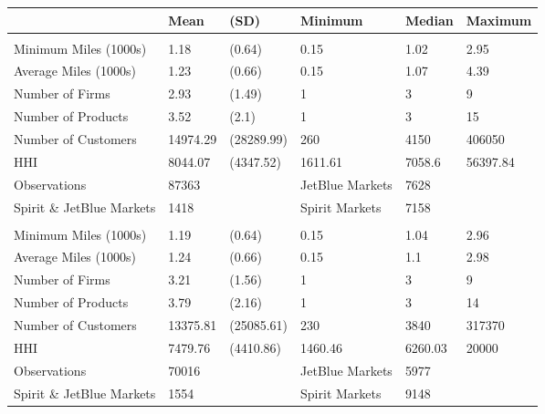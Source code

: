 
\begin{tabular}[t]{llllll}
\toprule
 & Mean & (SD) & Minimum & Median & Maximum\\
\midrule
\addlinespace[0.3em]
\multicolumn{6}{l}{\textbf{Pre-Pandemic}}\\
\hspace{1em}Minimum Miles (1000s) & 1.18 & (0.64) & 0.15 & 1.02 & 2.95\\
\hspace{1em}Average Miles (1000s) & 1.23 & (0.66) & 0.15 & 1.07 & 4.39\\
\hspace{1em}Number of Firms & 2.93 & (1.49) & 1 & 3 & 9\\
\hspace{1em}Number of Products & 3.52 & (2.1) & 1 & 3 & 15\\
\hspace{1em}Number of Customers & 14974.29 & (28289.99) & 260 & 4150 & 406050\\
\hspace{1em}HHI & 8044.07 & (4347.52) & 1611.61 & 7058.6 & 56397.84\\
\midrule
\hspace{1em}Observations & 87363 &  & JetBlue Markets & 7628 & \\
\hspace{1em}Spirit \& JetBlue Markets & 1418 &  & Spirit Markets & 7158 & \\
\midrule
\addlinespace[0.3em]
\multicolumn{6}{l}{\textbf{Post-Pandemic}}\\
\hspace{1em}Minimum Miles (1000s) & 1.19 & (0.64) & 0.15 & 1.04 & 2.96\\
\hspace{1em}Average Miles (1000s) & 1.24 & (0.66) & 0.15 & 1.1 & 2.98\\
\hspace{1em}Number of Firms & 3.21 & (1.56) & 1 & 3 & 9\\
\hspace{1em}Number of Products & 3.79 & (2.16) & 1 & 3 & 14\\
\hspace{1em}Number of Customers & 13375.81 & (25085.61) & 230 & 3840 & 317370\\
\hspace{1em}HHI & 7479.76 & (4410.86) & 1460.46 & 6260.03 & 20000\\
\midrule
\hspace{1em}Observations & 70016 &  & JetBlue Markets & 5977 & \\
\hspace{1em}Spirit \& JetBlue Markets & 1554 &  & Spirit Markets & 9148 & \\
\bottomrule
\end{tabular}
